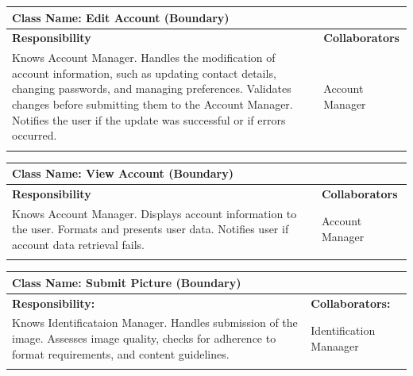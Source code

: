 \documentclass[]{article}
\begin{document}
	\begin{table}[H]
		\centering
		\begin{tabular}{|p{8cm}|p{8cm}|}
		\hline 
		\multicolumn{2}{|l|}{\textbf{Class Name:} Edit Account (Boundary)} \\
		\hline
		\textbf{Responsibility} & \textbf{Collaborators} \\
		\hline
		Knows Account Manager. \newline
		Handles the modification of account information, such as updating contact details, changing passwords, and managing preferences. \newline
		Validates changes before submitting them to the Account Manager. \newline
		Notifies the user if the update was successful or if errors occurred. 
		& Account Manager \\
		\vspace{1in} & \\
		\hline
		\end{tabular}
	\end{table}

	\begin{table}[H]
		\centering
		\begin{tabular}{|p{8cm}|p{8cm}|}
		\hline 
		\multicolumn{2}{|l|}{\textbf{Class Name:} View Account (Boundary)} \\
		\hline
		\textbf{Responsibility} & \textbf{Collaborators} \\
		\hline
		Knows Account Manager. \newline
		Displays account information to the user. \newline
		Formats and presents user data. \newline
		Notifies user if account data retrieval fails. 
		& Account Manager \\
		\vspace{1in} & \\
		\hline
		\end{tabular}
	\end{table}
	

	\begin{table}[H]
		\centering
		\begin{tabular}{|p{8cm}|p{8cm}|}
		\hline 
		 \multicolumn{2}{|l|}{\textbf{Class Name:} Submit Picture (Boundary)} \\
		\hline
		\textbf{Responsibility:} & \textbf{Collaborators:} \\
		\hline
		Knows Identificataion Manager. \newline Handles submission of the image. \newline Assesses image quality, checks for adherence to format requirements, and content guidelines. & Identification Manaager \\
		\vspace{1in} & \\
		\hline
		\end{tabular}
	\end{table}
\end{document}
